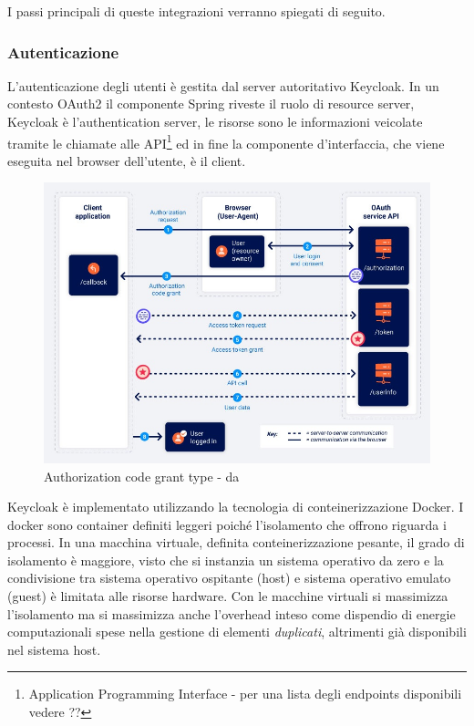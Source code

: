 \documentclass[a4paper,11pt]{article}
\begin{document}
I passi principali di queste integrazioni verranno spiegati di seguito.


\subsubsection{Autenticazione}
L'autenticazione degli utenti è gestita dal server autoritativo Keycloak. In un contesto OAuth2 il componente Spring riveste il ruolo di resource server, Keycloak è l'authentication server, le risorse sono le informazioni veicolate tramite le chiamate alle API\footnote{Application Programming Interface - per una lista degli endpoints disponibili vedere ?? } ed in fine la componente d'interfaccia, che viene eseguita nel browser dell'utente, è il client.

\begin{figure}[H]
  \includegraphics[width=1\linewidth]{img/oauth-authorization-code-flow.jpg}
  \caption{Authorization code grant type - da \cite{portswiggerOAuthGrant}}
  \label{fig:flussoportswigger}
\end{figure}

Keycloak è implementato utilizzando la tecnologia di conteinerizzazione Docker. I docker sono container definiti leggeri poiché l'isolamento che offrono riguarda i processi. In una macchina virtuale, definita conteinerizzazione pesante, il grado di isolamento è maggiore, visto che si instanzia un sistema operativo da zero e la condivisione tra sistema operativo ospitante (host) e sistema operativo emulato (guest) è limitata alle risorse hardware. Con le macchine virtuali si massimizza l'isolamento ma si massimizza anche l'overhead inteso come dispendio di energie computazionali spese nella gestione di elementi \textit{duplicati}, altrimenti già disponibili nel sistema host. \cite{dockerWhatContainer}
\end{document}
